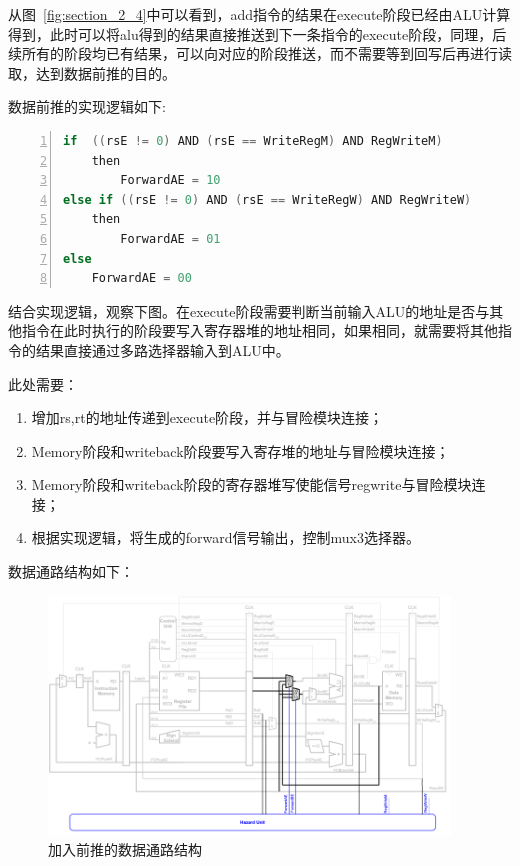 从图~\ref{fig:section_2_4}中可以看到，add指令的结果在execute阶段已经由ALU计算得到，此时可以将alu得到的结果直接推送到下一条指令的execute阶段，同理，后续所有的阶段均已有结果，可以向对应的阶段推送，而不需要等到回写后再进行读取，达到数据前推的目的。

数据前推的实现逻辑如下:
\begin{lstlisting}[language=Verilog,caption=数据前推的实现逻辑,numbers=left,xleftmargin=5em,xrightmargin=5em, aboveskip=2em]
if  ((rsE != 0) AND (rsE == WriteRegM) AND RegWriteM)     
	then 	
	    ForwardAE = 10
else if ((rsE != 0) AND (rsE == WriteRegW) AND RegWriteW) 
	then 	
	    ForwardAE = 01
else
    ForwardAE = 00

\end{lstlisting}
结合实现逻辑，观察下图。在execute阶段需要判断当前输入ALU的地址是否与其他指令在此时执行的阶段要写入寄存器堆的地址相同，如果相同，就需要将其他指令的结果直接通过多路选择器输入到ALU中。

此处需要：
\begin{enumerate}
    \item 增加rs,rt的地址传递到execute阶段，并与冒险模块连接；
    \item Memory阶段和writeback阶段要写入寄存堆的地址与冒险模块连接；
    \item Memory阶段和writeback阶段的寄存器堆写使能信号regwrite与冒险模块连接；
    \item 根据实现逻辑，将生成的forward信号输出，控制mux3选择器。
\end{enumerate}

数据通路结构如下：
\begin{figure}[htbp]
    \centering
    \includegraphics[width = 0.95\textwidth]{image/hazard.png}
    \caption{加入前推的数据通路结构}
    \label{fig:section_2_5}
\end{figure}

